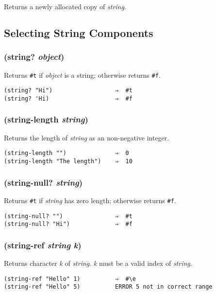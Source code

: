 \documentclass{article}
\begin{document}
Returns a newly allocated copy of \emph{string}.

\subsection{Selecting String Components}\label{sec:selecting-string-components}

\subsubsection{(string? \emph{object})}

Returns \verb|#t| if \emph{object} is a string; otherwise returns \verb|#f|.

\begin{verbatim}
(string? "Hi")                  ⇒  #t
(string? 'Hi)                   ⇒  #f
\end{verbatim}

\subsubsection{(string-length \emph{string})}

Returns the length of \emph{string} as an non-negative integer.

\begin{verbatim}
(string-length "")              ⇒  0
(string-length "The length")    ⇒  10
\end{verbatim}

\subsubsection{(string-null? \emph{string})}

Returns \verb|#t| if \emph{string} has zero length; otherwise returns \verb|#f|.

\begin{verbatim}
(string-null? "")               ⇒  #t
(string-null? "Hi")             ⇒  #f
\end{verbatim}

\subsubsection{(string-ref \emph{string} \emph{k})}

Returns character \emph{k} of \emph{string}. \emph{k} must be a valid index of \emph{string}.

\begin{verbatim}
(string-ref "Hello" 1)          ⇒  #\e
(string-ref "Hello" 5)          ERROR 5 not in correct range
\end{verbatim}
\end{document}
